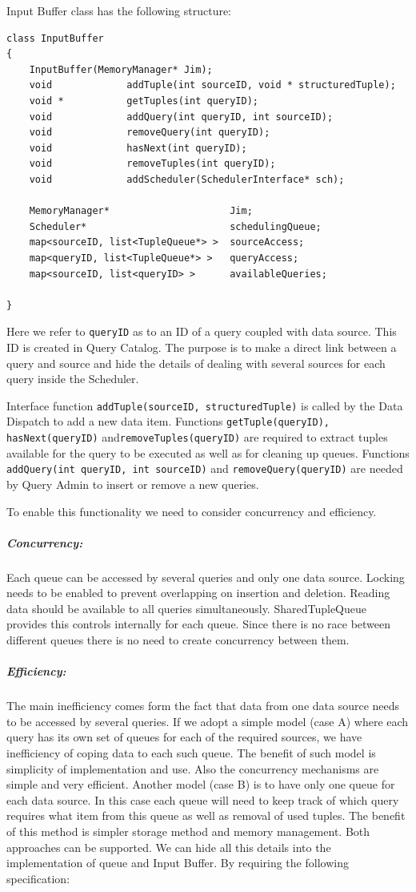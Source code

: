 \documentclass[14pt]{article}
\begin{document}
Input Buffer class has the following structure:

\begin{verbatim}
class InputBuffer
{
	InputBuffer(MemoryManager* Jim);
    void             addTuple(int sourceID, void * structuredTuple);
    void *           getTuples(int queryID);
    void             addQuery(int queryID, int sourceID);
    void             removeQuery(int queryID);
    void             hasNext(int queryID);
    void             removeTuples(int queryID);
    void             addScheduler(SchedulerInterface* sch);

	MemoryManager*                     Jim;
	Scheduler*                         schedulingQueue;
	map<sourceID, list<TupleQueue*> >  sourceAccess;
	map<queryID, list<TupleQueue*> >   queryAccess;
	map<sourceID, list<queryID> >      availableQueries;
	
}
\end{verbatim}

\noindent Here we refer to {\tt queryID} as to an ID of a query coupled with data source. This ID is created in Query Catalog. The purpose is to make a direct link between a query and source and hide the details of dealing with several sources for each query inside the Scheduler.

Interface function {\tt addTuple(sourceID, structuredTuple)} is called by the Data Dispatch to add a new data item. Functions {\tt getTuple(queryID), hasNext(queryID)} and{\tt removeTuples(queryID)} are required to extract tuples available for the query to be executed as well as for cleaning up queues. Functions {\tt addQuery(int queryID, int sourceID)} and {\tt removeQuery(queryID)} are needed by Query Admin to insert or remove a new queries. 

To enable this functionality we need to consider concurrency and efficiency. 

\subparagraph{Concurrency:} Each queue can be accessed by several queries and only one data source. Locking needs to be enabled to prevent overlapping on insertion and deletion. Reading data should be available to all queries simultaneously. SharedTupleQueue provides this controls internally for each queue. Since there is no race between different queues there is no need to create concurrency between them.

\subparagraph{Efficiency:} The main inefficiency comes form the fact that data from one data source needs to be accessed by several queries. If we adopt a simple model (case A) where each query has its own set of queues for each of the required sources, we have inefficiency of coping data to each such queue. The benefit of such model is simplicity of implementation and use. Also the concurrency mechanisms are simple and very efficient. Another model (case B) is to have only one queue for each data source. In this case each queue will need to keep track of which query requires what item from this queue as well as removal of used tuples. The benefit of this method is simpler storage method and memory management. Both approaches can be supported. We can hide all this details into the implementation of queue and Input Buffer. By requiring the following specification:
\end{document}
